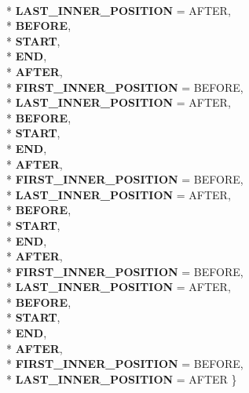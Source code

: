 \begin{DoxyCompactItemize}
\\*
{\bfseries L\+A\+S\+T\+\_\+\+I\+N\+N\+E\+R\+\_\+\+P\+O\+S\+I\+T\+I\+ON} = A\+F\+T\+ER, 
\\*
{\bfseries B\+E\+F\+O\+RE}, 
\\*
{\bfseries S\+T\+A\+RT}, 
\\*
{\bfseries E\+ND}, 
\\*
{\bfseries A\+F\+T\+ER}, 
\\*
{\bfseries F\+I\+R\+S\+T\+\_\+\+I\+N\+N\+E\+R\+\_\+\+P\+O\+S\+I\+T\+I\+ON} = B\+E\+F\+O\+RE, 
\\*
{\bfseries L\+A\+S\+T\+\_\+\+I\+N\+N\+E\+R\+\_\+\+P\+O\+S\+I\+T\+I\+ON} = A\+F\+T\+ER, 
\\*
{\bfseries B\+E\+F\+O\+RE}, 
\\*
{\bfseries S\+T\+A\+RT}, 
\\*
{\bfseries E\+ND}, 
\\*
{\bfseries A\+F\+T\+ER}, 
\\*
{\bfseries F\+I\+R\+S\+T\+\_\+\+I\+N\+N\+E\+R\+\_\+\+P\+O\+S\+I\+T\+I\+ON} = B\+E\+F\+O\+RE, 
\\*
{\bfseries L\+A\+S\+T\+\_\+\+I\+N\+N\+E\+R\+\_\+\+P\+O\+S\+I\+T\+I\+ON} = A\+F\+T\+ER, 
\\*
{\bfseries B\+E\+F\+O\+RE}, 
\\*
{\bfseries S\+T\+A\+RT}, 
\\*
{\bfseries E\+ND}, 
\\*
{\bfseries A\+F\+T\+ER}, 
\\*
{\bfseries F\+I\+R\+S\+T\+\_\+\+I\+N\+N\+E\+R\+\_\+\+P\+O\+S\+I\+T\+I\+ON} = B\+E\+F\+O\+RE, 
\\*
{\bfseries L\+A\+S\+T\+\_\+\+I\+N\+N\+E\+R\+\_\+\+P\+O\+S\+I\+T\+I\+ON} = A\+F\+T\+ER, 
\\*
{\bfseries B\+E\+F\+O\+RE}, 
\\*
{\bfseries S\+T\+A\+RT}, 
\\*
{\bfseries E\+ND}, 
\\*
{\bfseries A\+F\+T\+ER}, 
\\*
{\bfseries F\+I\+R\+S\+T\+\_\+\+I\+N\+N\+E\+R\+\_\+\+P\+O\+S\+I\+T\+I\+ON} = B\+E\+F\+O\+RE, 
\\*
{\bfseries L\+A\+S\+T\+\_\+\+I\+N\+N\+E\+R\+\_\+\+P\+O\+S\+I\+T\+I\+ON} = A\+F\+T\+ER
 \}\hypertarget{classv8_1_1internal_1_1_l_gap_ac4743ec140d442da0a1d34d826eaa9eb}{}\label{classv8_1_1internal_1_1_l_gap_ac4743ec140d442da0a1d34d826eaa9eb}


\end{DoxyCompactItemize}
